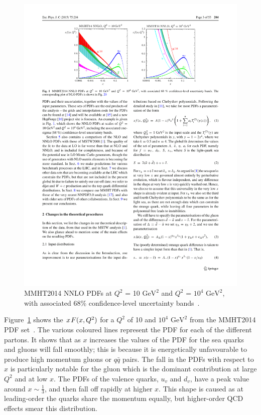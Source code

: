 \begin{figure}[!b]
  \begin{center}
    \includegraphics[width=1\linewidth, angle=0]{figs/Theory/qcd_pdf.pdf}
  \end{center}
  \caption[MMHT2014 NNLO PDFs at $Q^2$ = 10 $\text{GeV}^2$ and $Q^2$ = $10^4$ $\text{GeV}^2$, with associated 68\% confidence-level uncertainty bands.]
  {MMHT2014 NNLO PDFs at $Q^2$ = 10 $\text{GeV}^2$ and $Q^2$ = $10^4$ $\text{GeV}^2$, with associated 68\% confidence-level uncertainty bands~\cite{theo-qcd_pdf}.}
  \label{fig:theo-qcd_pdf}
\end{figure}


Figure~\ref{fig:theo-qcd_pdf} shows the $x\hspace{0.3mm}F(x,Q^2)$ for a $Q^2$ of 10 and $10^4$ $\text{GeV}^2$
from the MMHT2014 PDF set~\cite{theo-qcd_pdf}.
The various coloured lines represent the PDF for each of the different partons.
It shows that as $x$ increases the values of the PDF for the sea quarks and gluons will fall smoothly;
this is because it is energetically unfavourable to produce high momentum gluons or $q\bar{q}$ pairs.
The fall in the PDFs with respect to $x$ is particularly notable for the gluon which is the dominant contribution at large $Q^2$ and at low $x$.
The PDFs of the valence quarks, $u_v$ and $d_v$, have a peak value around $x \sim \frac{1}{3}$, and then fall off rapidly at higher $x$.
This shape is caused as at leading-order the quarks share the momentum equally, but higher-order QCD effects smear this distribution.


